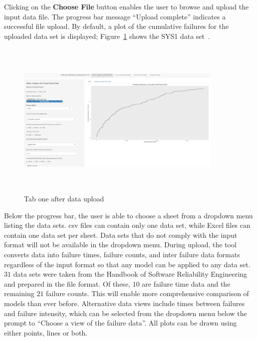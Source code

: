 \documentclass[journal]{IEEEtran}
\begin{document}
Clicking on the \textbf{Choose File} button enables the user to browse and upload the input data file. The progress bar message ``Upload complete'' indicates a successful file upload. By default, a plot of the cumulative failures for the uploaded data set is displayed; Figure~\ref{fig_Tab1_CDF} shows the SYS1 data set~\cite{BookHoSRE}.

\begin{figure}[!h]
\centering
\includegraphics[width=3.9in, height=3in]{Figures/Fig4}
\caption{Tab one after data upload}
\label{fig_Tab1_CDF}
\end{figure}


Below the progress bar, the user is able to choose a sheet from a dropdown menu listing the data sets. csv files can contain only one data set, while Excel files can contain one data set per sheet. Data sets that do not comply with the input format will not be available in the dropdown menu. During upload, the tool converts data into failure times, failure counts, and inter failure data formats regardless of the input format so that any model can be applied to any data set. $31$ data sets were taken from the Handbook of Software Reliability Engineering~\cite{BookHoSRE} and prepared in the file format. Of these, $10$ are failure time data and the remaining $21$ failure counts. This will enable more comprehensive comparison of models than ever before. Alternative data views include times between failures and failure intensity, which can be selected from the dropdown menu below the prompt to ``Choose a view of the failure data''. All plots can be drawn using either points, lines or both.

\end{document}

